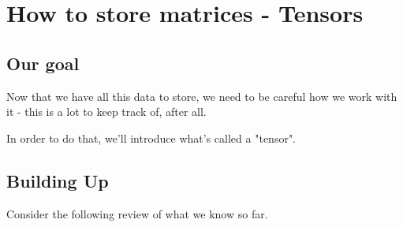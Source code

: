         
        
        
        
        
        
        
        
\section{How to store matrices - Tensors}

    \subsection{Our goal}
    
        Now that we have all this data to store, we need to be careful how we work with it - this is a lot to keep track of, after all.
        
        In order to do that, we'll introduce what's called a "tensor".
        
    \subsection{Building Up}
    
        Consider the following review of what we know so far.
        
